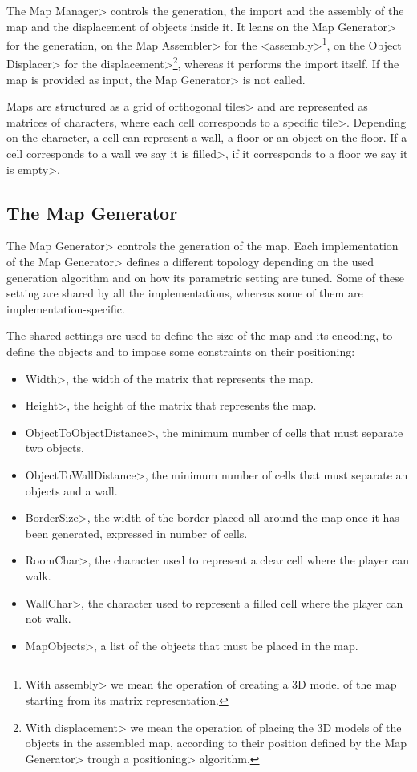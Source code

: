 The \<Map Manager> controls the generation, the import and the assembly of the map and the displacement of objects inside it. It leans on the \<Map Generator> for the generation, on the \<Map Assembler> for the <assembly>\footnote{With \<assembly> we mean the operation of creating a 3D model of the map starting from its matrix representation.}, on the \<Object Displacer> for the \<displacement>\footnote{With \<displacement> we mean the operation of placing the 3D models of the objects in the assembled map, according to their position defined by the \<Map Generator> trough a \<positioning> algorithm.}, whereas it performs the import itself. If the map is provided as input, the \<Map Generator> is not called.

\par

Maps are structured as a grid of orthogonal \<tiles> and are represented as matrices of characters, where each cell corresponds to a specific \<tile>. Depending on the character, a cell can represent a wall, a floor or an object on the floor. If a cell corresponds to a wall we say it is \<filled>, if it corresponds to a floor we say it is \<empty>.

\subsection{The Map Generator}

The \<Map Generator> controls the generation of the map. Each implementation of the \<Map Generator> defines a different topology depending on the used generation algorithm and on how its parametric setting are tuned. Some of these setting are shared by all the implementations, whereas some of them are implementation-specific.

\par

The shared settings are used to define the size of the map and its encoding, to define the objects and to impose some constraints on their positioning:

\begin{itemize}
\item \<Width>, the width of the matrix that represents the map.
\item \<Height>, the height of the matrix that represents the map.
\item \<ObjectToObjectDistance>, the minimum number of cells that must separate two objects. 
\item \<ObjectToWallDistance>, the minimum number of cells  that must separate an objects and a wall.
\item \<BorderSize>, the width of the border placed all around the map once it has been generated, expressed in number of cells.
\item \<RoomChar>, the character used to represent a clear cell where the player can walk.
\item \<WallChar>,  the character used to represent a filled cell where the player can not walk.
\item \<MapObjects>, a list of the objects that must be placed in the map.
\end{itemize}

